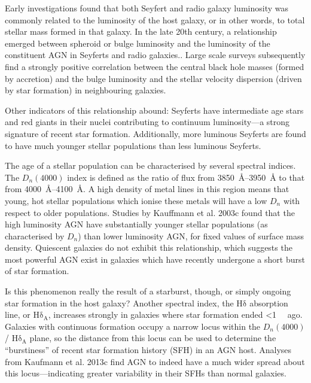 \documentclass[a4paper,12pt]{article}
\begin{document}
Early investigations found that both Seyfert and radio galaxy luminosity was
commonly related to the luminosity of the host galaxy, or in other words, to
total stellar mass formed in that galaxy. In the late 20th century, a
relationship emerged between spheroid or bulge luminosity and the luminosity of
the constituent AGN in Seyferts and radio galaxies.\cite{Lawrence_1987}. Large
scale surveys subsequently find a strongly positive correlation between the
central black hole masses (formed by accretion) and the bulge luminosity and
the stellar velocity dispersion (driven by star formation) in neighbouring
galaxies.\cite{Veilleux_2008}

Other indicators of this relationship abound: Seyferts have intermediate age
stars and red giants in their nuclei contributing to continuum luminosity---a
strong signature of recent star formation. Additionally, more luminous Seyferts
are found to have much younger stellar populations than less luminous
Seyferts.\cite{Veilleux_2008}

The age of a stellar population can be characterised by several spectral
indices. The $D_n(4000)$ index is defined as the ratio of flux from
\SIrange{3850}{3950}{\angstrom} to that from \SIrange{4000}{4100}{\angstrom}. A
high density of metal lines in this region means that young, hot stellar
populations which ionise these metals will have a low $D_n$ with respect to
older populations.\cite{Kauffmann_2003a} Studies by Kauffmann et al. 2003c
found that the high luminosity AGN have substantially younger stellar
populations (as characterised by $D_n$) than lower luminosity AGN, for fixed
values of surface mass density. Quiescent galaxies do not exhibit this
relationship, which suggests the most powerful AGN exist in galaxies which have
recently undergone a short burst of star formation.\cite{Kauffmann_2003c}

Is this phenomenon really the result of a starburst, though, or simply ongoing
star formation in the host galaxy? Another spectral index, the
$\mathrm{H\delta}$ absorption line, or $\mathrm{H\delta_A}$, increases strongly
in galaxies where star formation ended \textless \SI{1}{\giga\year} ago.
Galaxies with continuous formation occupy a narrow locus within the $D_n(4000)$/
$\mathrm{H\delta_A}$ plane, so the distance from this locus can be used to
determine the ``burstiness'' of recent star formation history (SFH) in an AGN
host. Analyses from Kaufmann et al. 2013c find AGN to indeed have a much wider
spread about this locus---indicating greater variability in their SFHs than
normal galaxies.\cite{Kauffmann_2003c}
\end{document}

